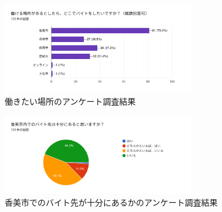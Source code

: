 \begin{figure}[H]
  \centering
  \includegraphics[width=0.75\textwidth]{働く場所の希望_アンケート結果.png}
  \caption{働きたい場所のアンケート調査結果}
  \label{fig:アンケート0}
\end{figure}
\begin{figure}[H]
  \centering
  \includegraphics[width=0.75\textwidth]{香美市でのバイト先が十分にあるか_アンケート結果.png}
  \caption{香美市でのバイト先が十分にあるかのアンケート調査結果}
  \label{fig:アンケート1}
\end{figure}

